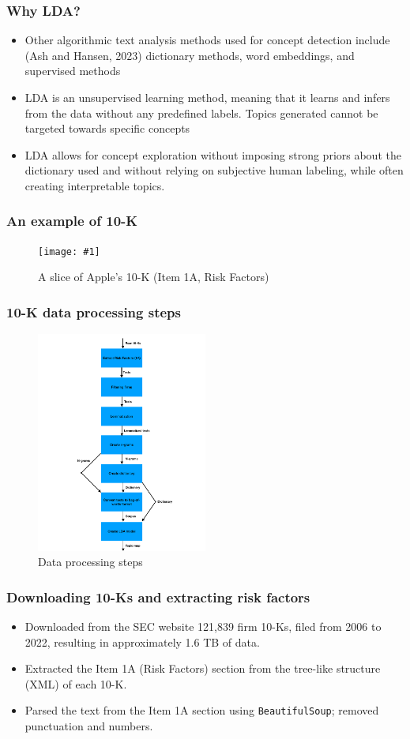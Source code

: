 \documentclass{beamer}
\newcommand{\insertfigurenoffo}[3]{
\begin{figure}[h!]
  \centering
  \texttt{[image: \#1]}
  \caption{#2}
  \label{fig:#1}
\end{figure}
}
\begin{document}
\begin{frame}
\frametitle{Why LDA?}
\begin{itemize}
\item Other algorithmic text analysis methods used for concept detection include (Ash and Hansen, 2023) dictionary methods, word embeddings, and supervised methods
\item LDA is an unsupervised learning method, meaning that it learns and infers from the data without any predefined labels. Topics generated cannot be targeted towards specific concepts
\item LDA allows for concept exploration without imposing strong priors about the dictionary used and without relying on subjective human labeling, while often creating interpretable topics.
\end{itemize}
\end{frame}

\begin{frame}
  \frametitle{An example of 10-K}
\insertfigurenoffo{apples_1a}{A slice of Apple's 10-K (Item 1A, Risk Factors)}{0.8}
\end{frame}

\begin{frame}
\frametitle{10-K data processing steps}
\begin{figure}[h!]
  \centering
  \includegraphics[width=0.5\textwidth]{data_steps.pdf}
  \caption{Data processing steps}
  \label{data_steps}
\end{figure}
\end{frame}

\begin{frame}
\frametitle{Downloading 10-Ks and extracting risk factors}
\begin{itemize}
\item Downloaded from the SEC website 121,839 firm 10-Ks, filed from 2006 to 2022, resulting in approximately 1.6 TB of data. 
\item Extracted the Item 1A (Risk Factors) section from the tree-like structure (XML) of each 10-K.
\item Parsed the text from the Item 1A section using \texttt{BeautifulSoup}; removed punctuation and numbers.
\end{itemize}
\end{frame}
\end{document}
